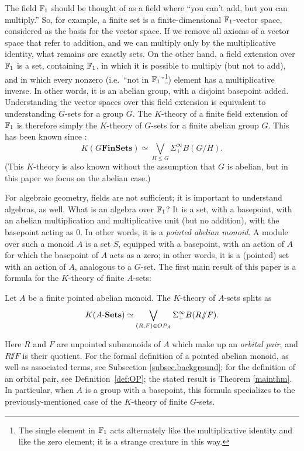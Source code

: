 \documentclass[11pt]{amsart}
\renewcommand{\ss}{\mathord{\sslash}}
\begin{document}
The field $\mathbb{F}_1$ should be thought of as a field where ``you can't add, but you can multiply.''  So, for example, a finite set is a finite-dimensional $\mathbb{F}_1$-vector space, considered as the basis for the vector space.  If we remove all axioms of a vector space that refer to addition, and we can multiply only by the multiplicative identity, what remains are exactly sets.   On the other hand, a field extension over $\mathbb{F}_1$ is a set, containing $\mathbb{F}_1$, in which it is possible to multiply (but not to add), and in which every nonzero (i.e.\ ``not in $\mathbb{F}_1$''\footnote{The single element in $\mathbb{F}_1$ acts alternately like the multiplicative identity and like the zero element; it is a strange creature in this way.}) element has a multiplicative inverse.  In other words, it is an abelian group, with a disjoint basepoint added.  Understanding the vector spaces over this field extension is equivalent to understanding $G$-sets for a group $G$.  
The $K$-theory of a finite field extension of $\mathbb{F}_1$ is therefore simply the $K$-theory of $G$-sets for a finite abelian group $G$.  This has been known since \cite[Proposition 3.6]{segal_coh}:
\[K(G\mathbf{FinSets}) \simeq \bigvee_{H \leq G} \Sigma^\infty_+ B(G/H).\]
(This $K$-theory is also known without the assumption that $G$ is abelian, but in this paper we focus on the abelian case.)

For algebraic geometry, fields are not sufficient; it is important to understand algebras, as well.  What is an algebra over $\mathbb{F}_1$?  It is a set, with a basepoint, with an abelian multiplication and multiplicative unit (but no addition), with the basepoint acting as $0$.  In other words, it is a \emph{pointed abelian monoid}.  A module over such a monoid $A$ is a set $S$, equipped with a basepoint, with an action of $A$ for which the basepoint of $A$ acts as a zero; in other words, it is a (pointed) set with an action of $A$, analogous to a $G$-set.  The first main result of this paper is a formula for the $K$-theory of finite $A$-sets:
\begin{maintheorem} \label{main:mainthm}
    Let $A$ be a finite pointed abelian monoid.  The $K$-theory of $A$-sets splits as
    \[K(\ASets) \simeq \bigvee_{(R,F)\in OP_A} \Sigma^\infty_+ B(R\ss F).\]
\end{maintheorem}
Here $R$ and $F$ are unpointed submonoids of $A$ which make up an \emph{orbital pair}, and $R \ss F$ is their quotient. For the formal definition of a pointed abelian monoid, as well as associated terms, see  Subsection \ref{subsec.background}; for the definition of an orbital pair, see Definition~\ref{def:OP}; the stated result is Theorem \ref{mainthm}.  In particular, when $A$ is a group with a basepoint, this formula specializes to the previously-mentioned case of the $K$-theory of finite $G$-sets.
\end{document}

